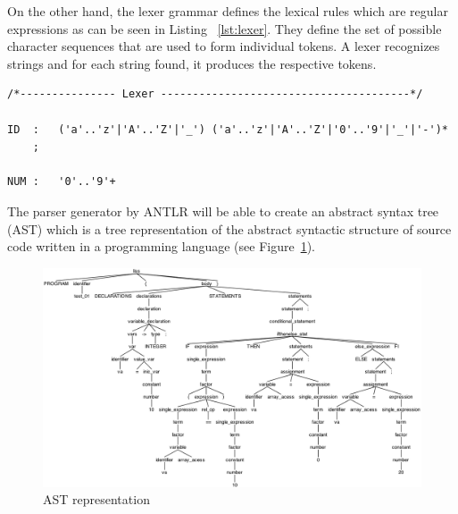 \documentclass[
  oneside,
  11pt, a4paper,
  footinclude=true,
  headinclude=true,
  cleardoublepage=empty
]{scrbook}
\begin{document}
On the other hand, the lexer grammar defines the lexical rules which are regular expressions as can be seen in Listing ~\ref{lst:lexer}. They define the set of possible character sequences that are used to form individual tokens. A lexer recognizes strings and for each string found, it produces the respective tokens. %

\begin{lstlisting}[caption={Lexer representation},label={lst:lexer}]
/*--------------- Lexer ---------------------------------------*/

ID  :   ('a'..'z'|'A'..'Z'|'_') ('a'..'z'|'A'..'Z'|'0'..'9'|'_'|'-')*
    ;

NUM :   '0'..'9'+
\end{lstlisting}



The parser generator by ANTLR will be able to create an abstract syntax tree (AST) which is a tree representation of the abstract syntactic structure of source code written in a programming language (see Figure~\ref{fig:AST}).

\begin{figure}[h!]
  \centering
    \includegraphics[width=1\textwidth]{img/antlr4_parse_tree.png}
    \caption{AST representation}
    \label{fig:AST}
\end{figure}
\end{document}
